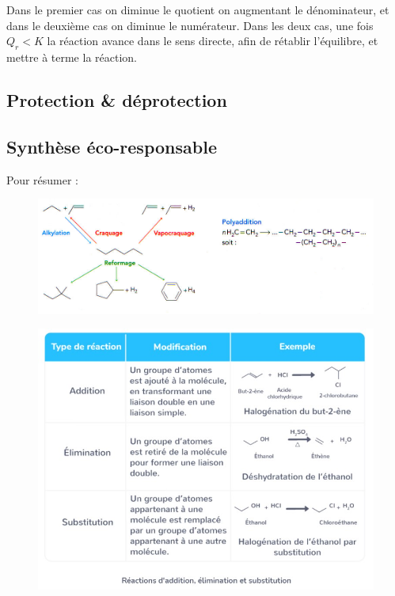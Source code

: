 \documentclass[11pt,a4paper]{article}
\begin{document}
Dans le premier cas on diminue le quotient on augmentant le dénominateur, et dans le deuxième cas on diminue le numérateur. Dans les deux cas, une fois $Q_r<K$ la réaction avance dans le sens directe, afin de rétablir l'équilibre, et mettre à terme la réaction. 

\subsection{Protection \& déprotection}

\subsection{Synthèse éco-responsable}

Pour résumer : 

\begin{figure}[H]
    \centering
    \includegraphics[width=0.95\linewidth]{imgs/c5/synthRECAP.jpg}
\end{figure}

\begin{figure}[H]
    \centering
    \includegraphics[width=0.95\linewidth]{imgs/c5/catRX.jpg}
\end{figure}
\end{document}
